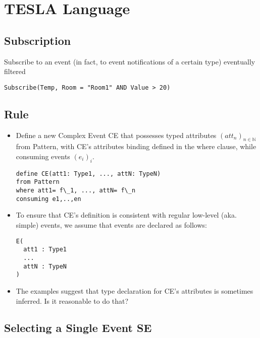 \section{TESLA Language \cite{Cugola-Margara:2010}}
\label{sec:DSL-TESLA}

\subsection{Subscription}
\label{sec:Subscription}

Subscribe to an event (in fact, to event notifications of a
certain type) eventually filtered

\begin{lstlisting}[language=iotdsl]
Subscribe(Temp, Room = "Room1" AND Value > 20)
\end{lstlisting}

\subsection{Rule}
\label{sec:Rule}

\begin{itemize}
	\item Define a new Complex Event \textsf{CE} that possesses typed attributes
			$(att_n)_{n\in\mathbb{N}}$ from \textsf{Pattern}, with \textsf{CE}'s attributes binding defined in the where clause, while consuming events $(e_i)_i$.

\begin{lstlisting}[language=iotdsl]
define CE(att1: Type1, ..., attN: TypeN)
from Pattern
where att1= f\_1, ..., attN= f\_n
consuming e1,..,en
\end{lstlisting}

	\item To ensure that CE's definition is consistent with regular low-level (aka.
			simple) events, we assume that events are declared as follows:

\begin{lstlisting}[language=iotdsl]
E(
  att1 : Type1
  ...
  attN : TypeN
)
\end{lstlisting}

	\item The examples suggest that type declaration for CE's attributes is sometimes inferred. Is it reasonable to do that?
\end{itemize}







\subsection{Selecting a Single Event SE}
\label{sec:SelectingASingleEventSE}

